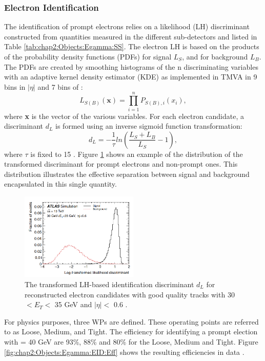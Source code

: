 \subsubsection{Electron Identification}
\label{chap2:Objects:Egamma:EID}
The identification of prompt electrons relies on a likelihood (LH) discriminant constructed from quantities measured in the different sub-detectors and listed in Table \ref{tab:chap2:Objects:Egamma:SS}. The electron LH is based on the products of the probability density functions (PDFs) for signal $L_S$, and for background $L_B$. The PDFs are created by smoothing histograms of the n discriminating variables with an adaptive kernel density estimator (KDE) \cite{KDE} as implemented in TMVA \cite{TMVA} in 9 bins in $|\eta|$ and 7 bins of \eT:
\begin{equation}
    L_{S(B)}(\textbf{x}) = \displaystyle\prod_{i=1}^{n} P_{S(B),i}(x_i),
\end{equation}
where \textbf{x} is the vector of the various variables. For each electron candidate, a discriminant $d_L$ is formed using an inverse sigmoid function transformation:
\begin{equation}
    d_L = -\frac{1}{\tau}ln(\frac{L_S+L_B}{L_S} - 1),
\end{equation}
where $\tau$ is fixed to 15 \cite{TMVA}. Figure \ref{fig:chap2:Objects:Egamma:EID:LH} shows an example of the distribution of the transformed discriminant for prompt electrons and non-prompt ones. This distribution illustrates the effective separation between signal and background encapsulated in this single quantity.
\begin{figure}[htbp]
    \centering
    \includegraphics[width=0.5\textwidth]{Ch2/Img/Electron_LH.png}
    \caption{The transformed LH-based identification discriminant $d_L$ for reconstructed electron candidates with good quality tracks with 30 $<E_T<$ 35 GeV and $|\eta|<$ 0.6 \cite{Electron_ID_2016}.}
    \label{fig:chap2:Objects:Egamma:EID:LH}
\end{figure}
For physics purposes, three WPs are defined. These operating points are referred to as Loose, Medium, and Tight. The efficiency for identifying a prompt election with \eT = 40 GeV are 93\%, 88\% and 80\% for the Loose, Medium and Tight. Figure \ref{fig:chap2:Objects:Egamma:EID:Eff} shows the resulting efficiencies in data \cite{Egamma_Perf_run2}.
